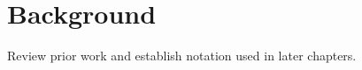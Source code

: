 \chapter{Background}
\label{ch:background}

Review prior work and establish notation used in later chapters.
